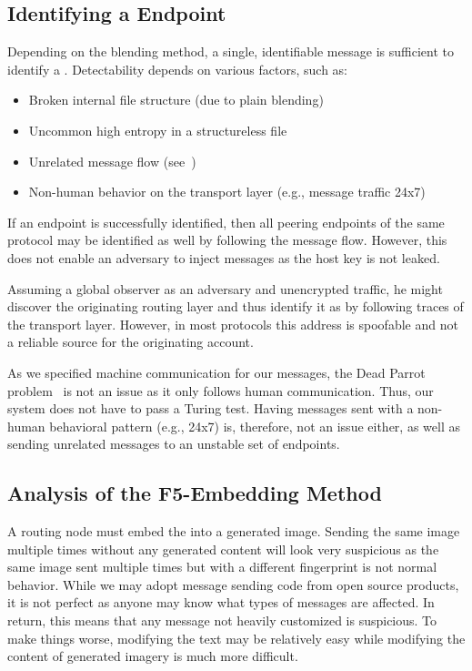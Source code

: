 \subsection{Identifying a \VortexMessage{} Endpoint}
Depending on the blending method, a single, identifiable message is sufficient to identify a \VortexNode. Detectability depends on various factors, such as:

\begin{itemize}
	\item Broken internal file structure (due to plain blending)
	\item Uncommon high entropy in a structureless file
	\item Unrelated message flow (see~\cite{oakland2013-parrot})
	\item Non-human behavior on the transport layer (e.g., message traffic 24x7)
\end{itemize}

If an endpoint is successfully identified, then all peering endpoints of the same protocol may be identified as well by following the message flow. However, this does not enable an adversary to inject messages as the host key is not leaked. 

Assuming a global observer as an adversary and unencrypted traffic, %
 he might discover the originating routing layer and thus identify it as \VortexNode{} by following traces of the transport layer. However, in most protocols this address is spoofable and not a reliable source for the originating account.

As we specified machine communication for our messages, the Dead Parrot problem~\cite{oaklan/d2013-parrot} is not an issue as it only follows human communication. Thus, our system does not have to pass a Turing test. Having messages sent with a non-human behavioral pattern (e.g., 24x7) is, therefore, not an issue either, as well as sending unrelated messages to an unstable set of endpoints. 

\subsection{Analysis of the F5-Embedding Method}
A routing node must embed the \VortexMessage{} into a generated image. Sending the same image multiple times without any generated content will look very suspicious as the same image sent multiple times but with a different fingerprint is not normal behavior. While we may adopt message sending code from open source products, it is not perfect as anyone may know what types of messages are affected. In return, this means that any message not heavily customized is suspicious. To make things worse, modifying the text may be relatively easy while modifying the content of generated imagery is much more difficult.

